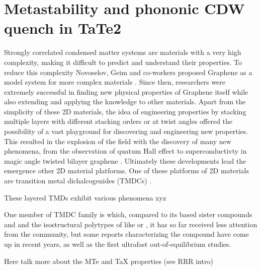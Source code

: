 \chapter{Metastability and phononic CDW quench in TaTe2}

Strongly correlated condensed matter systems are materials with a very high complexity, making it difficult to predict and understand their properties.
To reduce this complexity Novoselov, Geim and co-workers proposed Graphene as a model system for more complex materials \cite{novoselov_electric_2004, novoselov_two-dimensional_2005, geim_rise_2007}.
Since then, researchers were extremely successful in finding new physical properties of Graphene itself while also extending and applying the knowledge to other materials.
Apart from the simplicity of these 2D materials, the idea of engineering properties by stacking multiple layers with different stacking orders or at twist angles offered the possibility of a vast playground for discovering and engineering new properties.
This resulted in the explosion of the field with the discovery of many new phenomena, from the observation of quatum Hall effect \cite{zhang_experimental_2005} to superconductivty in magic angle twisted bilayer graphene \cite{cao_unconventional_2018}.
Ultimately these developments lead the emergence other 2D material platforms.
One of these platforms of 2D materials are transition metal dichalcogenides (TMDCs) \cite{butler_progress_2013, chowdhury_progress_2020, liu_van_2016}.

These layered TMDs exhibit various phenomena xyz


One member of TMDC family is  which, compared to its  based sister compounds  and  and the isostructural polytypes of  like  or , it has so far received less attention from the community, but some reports characterizing the compound have come up in recent years, as well as the first ultrafast out-of-equilibrium studies.

Here talk more about the MTe and TaX properties (see RRR intro)

